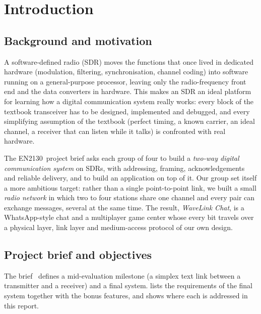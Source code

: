 \documentclass[11pt,a4paper,oneside]{report}
\newcommand{\CourseCode}{EN2130}
\begin{document}
\cleardoublepage
{}
\chapter{Introduction}\label{ch:intro}

\section{Background and motivation}
A software-defined radio (SDR) moves the functions that once lived in dedicated hardware
(modulation, filtering, synchronisation, channel coding) into software running on a general-purpose
processor, leaving only the radio-frequency front end and the data converters in hardware. This makes
an SDR an ideal platform for learning how a digital communication system really works: every block
of the textbook transceiver has to be designed, implemented and debugged, and every simplifying
assumption of the textbook (perfect timing, a known carrier, an ideal channel, a receiver that can
listen while it talks) is confronted with real hardware.

The \CourseCode\ project brief asks each group of four to build a \emph{two-way digital
communication system} on SDRs, with addressing, framing, acknowledgements and reliable delivery,
and to build an application on top of it. Our group set itself a more ambitious target: rather
than a single point-to-point link, we built a small \emph{radio network} in which two to four
stations share one channel and every pair can exchange messages, several at the same time. The
result, \emph{WaveLink Chat}, is a WhatsApp-style chat and a multiplayer game center whose every
bit travels over a physical layer, link layer and medium-access protocol of our own design.

\section{Project brief and objectives}\label{sec:brief}
The brief~\cite{brief} defines a mid-evaluation milestone (a simplex text link between a
transmitter and a receiver) and a final system.  lists the requirements of the
final system together with the bonus features, and shows where each is addressed in this report.
\end{document}
